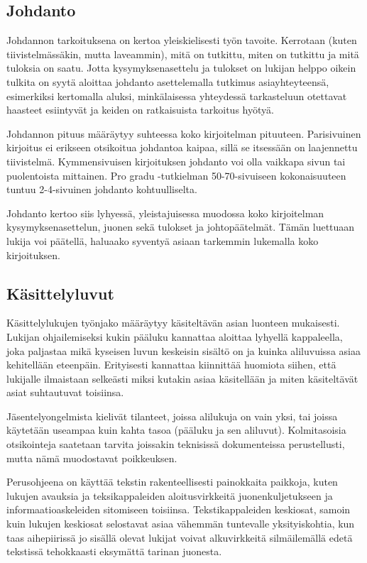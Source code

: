 \documentclass[finnish,gradu]{tktltiki}
\begin{document}
\subsection{Johdanto}


Johdannon tarkoituksena on kertoa yleiskielisesti
työn tavoite. Kerrotaan (kuten tiivistelmässäkin, mutta laveammin),
mitä on tutkittu, miten on tutkittu ja mitä tuloksia on saatu.
Jotta kysymyksenasettelu ja tulokset on lukijan helppo oikein tulkita on syytä aloittaa johdanto asettelemalla tutkimus asiayhteyteensä, esimerkiksi kertomalla aluksi, minkälaisessa yhteydessä tarkasteluun otettavat haasteet esiintyvät ja keiden on ratkaisuista tarkoitus hyötyä.

Johdannon pituus määräytyy suhteessa koko kirjoitelman pituuteen.
Parisivuinen kirjoitus ei erikseen otsikoitua johdantoa kaipaa, sillä
se itsessään on laajennettu tiivistelmä. Kymmensivuisen
kirjoituksen johdanto voi olla vaikkapa sivun tai puolentoista
mittainen. Pro gradu -tutkielman 50-70-sivuiseen kokonaisuuteen
tuntuu 2-4-sivuinen johdanto kohtuulliselta. 

Johdanto kertoo siis lyhyessä, yleistajuisessa muodossa
koko kirjoitelman kysymyksenasettelun, juonen sekä tulokset ja johtopäätelmät.
Tämän luettuaan lukija voi päätellä, haluaako syventyä asiaan tarkemmin
lukemalla koko kirjoituksen.


\subsection{Käsittelyluvut}

Käsittelylukujen työnjako määräytyy käsiteltävän asian luonteen
mukaisesti.
Lukijan ohjailemiseksi kukin pääluku kannattaa aloittaa lyhyellä
kappaleella, joka paljastaa mikä kyseisen luvun keskeisin sisältö on ja
kuinka aliluvuissa asiaa kehitellään eteenpäin.
Erityisesti kannattaa kiinnittää huomiota siihen, että lukijalle ilmaistaan selkeästi miksi kutakin asiaa käsitellään ja miten käsiteltävät asiat suhtautuvat toisiinsa. 

Jäsentelyongelmista kielivät tilanteet, joissa
alilukuja on vain yksi, tai joissa käytetään useampaa kuin
kahta tasoa (pääluku ja sen aliluvut). Kolmitasoisia
otsikointeja saatetaan tarvita joissakin teknisissä
dokumenteissa perustellusti, mutta nämä muodostavat poikkeuksen.

Perusohjeena on käyttää tekstin rakenteellisesti painokkaita paikkoja,
kuten lukujen avauksia ja teksikappaleiden aloitusvirkkeitä
juonenkuljetukseen ja informaatioaskeleiden sitomiseen toisiinsa.
Tekstikappaleiden keskiosat, samoin kuin lukujen keskiosat selostavat
asiaa vähemmän tuntevalle yksityiskohtia, kun taas aihepiirissä jo
sisällä olevat lukijat voivat alkuvirkkeitä silmäilemällä edetä
tekstissä tehokkaasti eksymättä tarinan juonesta.
\end{document}
